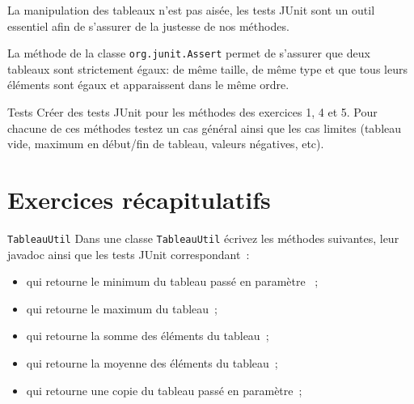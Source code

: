 \documentclass[a4paper,11pt]{article}
\begin{document}
	La manipulation des tableaux n'est pas aisée, les tests JUnit 
	sont un outil essentiel afin de s'assurer de la justesse de nos méthodes.
	
	La méthode  de la classe \texttt{org.junit.Assert}
	permet de s'assurer que deux tableaux sont strictement égaux: de même taille, 
	de même type et que tous leurs éléments sont égaux et 
	apparaissent dans le même ordre.


	\begin{Exercice}{Tests}	
		Créer des tests JUnit pour les méthodes des exercices 1, 4 et 5. Pour chacune 
		de ces méthodes testez un cas général ainsi que les cas limites (tableau vide,
		maximum en début/fin de tableau, valeurs négatives, etc).
	\end{Exercice}



\section{Exercices récapitulatifs}

	\begin{Exercice}{\texttt{TableauUtil}}	
		Dans une classe \texttt{TableauUtil} écrivez les méthodes suivantes, leur 
		javadoc ainsi que les tests JUnit correspondant~:
		\begin{itemize}
			\item {} qui retourne le minimum
				du tableau passé en paramètre ~;
			\item {} qui retourne le maximum
				du tableau~;
			\item {} qui retourne la somme
				des éléments du tableau~;
			\item {} qui retourne la
				 moyenne des éléments du tableau~;
			\item {} qui retourne une
			 copie du tableau passé en paramètre~;
		\end{itemize}
	\end{Exercice}
\end{document}
